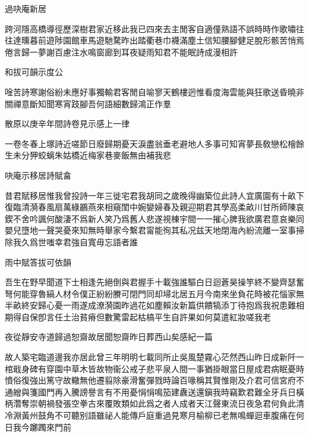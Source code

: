 \documentclass{zhvt-classic-Miya}
\begin{document}
\begin{fw}過吷庵新居\end{fw}

跨河隱高橋導徑歷深樹君家近移此我已四來去主閒客自適僮熟語不誤時時作歌嘯往往達曛暮前遊陟園館車馬遊馳騖昨出踏衢巷巾襪滿塵土信知腰腳健足脫形骸苦悄焉倦言歸一夢謝百慮注水鳴窗廊到耳夜疑雨知君不能眠詩成漫相許

\begin{fw}和拔可韻示度公\end{fw}

唫苦詩寒謝俗紛未應好事獨輸君客閒自喻寥天鶴樓迥惟看度海雲能與狂歌送昏曉非關禪意斷知聞寒宵跂腳吾何語細數歸鴻正作羣

\begin{fw}散原以庚辛年間詩卷見示感上一律\end{fw}

一卷冬春上塚詩近嗟節日廢歸期憂天淚盡翁垂老避地人多事可知宵夢長敎戀松檜餘生未分狎蛟螭朱姑橋近梅家巷麥飯無由補我悲

\begin{fw}吷庵示移居詩賦畣\end{fw}

昔君賦移居惟我曾投詩一年三徙宅君我胡同之歲晚得幽築位此詩人宜廣園有十畝下復臨清漪春風扇萬綠鸝燕來相窺閨中婉孌婦春及親迎期君其學高柔畝川甘所師陳哀鍥不舍吟諷何酸淒不爲新人笑乃爲舊人悲遂視棟宇間一一摧心脾我欲廣君意哀樂同嬰兒墮地一聲哭憂來知無時舉家今繫君甯能徇其私况兹天地閉海內紛流離一室事掃除我久爲世嗤幸君強自寬毋忘語者誰

\begin{fw}雨中賦答拔可依韻\end{fw}

吾生在野早聞道下士相逢先絕倒與君握手十載強誰驅白日迴蒼昊操竽終不變齊瑟奮弩何能穿魯縞人材令僕正紛紛賸可閉門同却埽北居五月今南來坐負花時被花惱家無半畝終安歸心憂一雨遂成潦漪園昨過花如塵賴汝新篇供饋犒添丁待抱爲我祝患難相期得自保卽言任土治貧瘠但數驚雷起枯槁平生自許果如何莫遣紅妝嗟我老

\begin{fw}夜從靜安寺道歸過恕齋故居聞恕齋昨日葬西山矣感紀一篇\end{fw}

故人築宅臨道邊我亦居此曾三年明明七載同所止吳風楚霧心茫然西山昨日成新阡一棺戢身碑有穿園中草木皆故物衞公戒子悲平泉人間一事猶掛眼當日屋成君病眠憂時憤俗復強出篤守故轍無他遷翦除豪滑奮彈戮時論百喙稱其賢惟剛及介君可信宮府不通繒與箋國門再入騰謗譽言有不用憂悁悁鳴笳建纛送還鎭我時竊歎君難全牙兵日橫柄濳奪崇朝禍發張空拳古來覆敗類如此爲之者人成者天江聲東流日夜急君何負此清冷淵黃州鼓角不可聽别語雖祕人能傳戶庭重過見寒月榆柳已老無鳴蟬迴車腹痛在何日我今躑躅來門前
\end{document}
